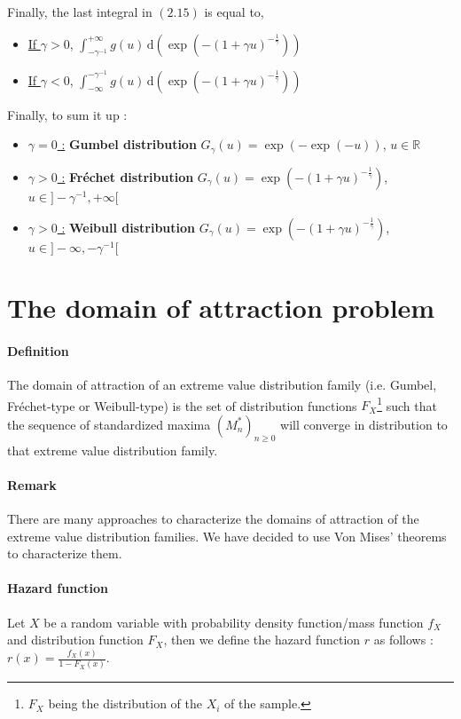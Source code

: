 Finally, the last integral in $(2.15)$ is equal to,
\begin{itemize}
	\item \underline{If $\gamma > 0$},  $\int_{ - \gamma^{-1}}^{+ \infty} \! g(u) \, \mathrm{d}(\exp(- (1 + \gamma u)^{- \frac{1}{\gamma}}))$ 
	\item \underline{If $\gamma < 0$},  $\int_{ - \infty}^{ - \gamma^{-1}} \! g(u) \, \mathrm{d}(\exp(- (1 + \gamma u)^{- \frac{1}{\gamma}}))$ 
\end{itemize}
Finally, to sum it up :
\begin{itemize}
	\item \underline{$\gamma = 0$ :} \textbf{Gumbel distribution} \newline
	$G_\gamma(u) = \exp(- \exp(- u))$, $u \in \mathbb{R}$
	\item \underline{$\gamma > 0$ :} \textbf{Fréchet distribution} \newline
	$G_\gamma(u) = \exp(- (1 + \gamma u)^{- \frac{1}{\gamma}})$, $u \in ]- \gamma^{-1}, + \infty[$
	\item \underline{$\gamma > 0$ :} \textbf{Weibull distribution} \newline
	$G_\gamma(u) = \exp(- (1 + \gamma u)^{- \frac{1}{\gamma}})$, $u \in ]- \infty, - \gamma^{-1}[$
\end{itemize}
\section{The domain of attraction problem}
\paragraph{Definition} The domain of attraction of an extreme value distribution family (i.e. Gumbel, Fréchet-type or Weibull-type) is the set of distribution functions $F_X$\footnote{$F_X$ being the distribution of the $X_i$ of the sample.} such that the sequence of standardized maxima $(M_n^*)_{n \ge 0}$ will converge in distribution to that extreme value distribution family.
\paragraph{Remark} There are many approaches to characterize the domains of attraction of the extreme value distribution families. We have decided to use Von Mises' theorems to characterize them.
\paragraph{Hazard function} Let $X$ be a random variable with probability density function/mass function $f_X$ and distribution function $F_X$, then we define the hazard function $r$ as follows : \newline
$r(x) = \frac{f_X(x)}{1 - F_X(x)}$.
